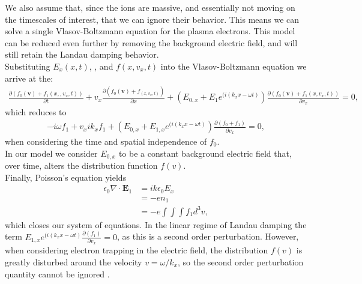\documentclass{article}
\begin{document}
We also assume that, since the ions are massive, and essentially not moving on the timescales of interest, that we can ignore their behavior. This means we can solve a single Vlasov-Boltzmann equation for the plasma electrons. This model can be reduced even further by removing the background electric field, and will still retain the Landau damping behavior.\\
Substituting $E_x(x,t)$, , and $f(x,v_x,t)$ into the Vlasov-Boltzmann equation we arrive at the:
\begin{align*}
\frac{\partial(f_0(\textbf{v}) + f_1(x,,v_x,t))}{\partial t} +  v_{x}\frac{\partial( f_0(\textbf{v}) + f_(x,v_x,t))}{\partial x} + (E_{0,x} + E_1e^{(i(k_x x-\omega t)})\frac{\partial(f_0(\textbf{v}) + f_1(x,v_x,t))}{\partial v_x}=0,
\end{align*}
which reduces to
\begin{align*}
-i\omega f_1 +  v_{x}ik_xf_1 + (E_{0,x} + E_{1,x}e^{(i(k_x x-\omega t)})\frac{\partial( f_0 + f_1)}{\partial v_x} =0,
\end{align*}
when considering the time and spatial independence of $f_0$.\\
In our model we consider $E_{0,x}$ to be a constant background electric field that, over time, alters the distribution function $f(v)$.\\
Finally, Poisson's equation yields
\begin{align*}
\epsilon_{0} \nabla \cdot \textbf{E}_1 &= ik \epsilon_0E_x\\
& = -en_1\\
& = -e \int \int \int f_1 d^3 v,
\end{align*}
which closes our system of equations.
In the linear regime of Landau damping the term $E_{1,x}e^{(i(k_x x-\omega t)}\frac{\partial(  f_1)}{\partial v_x}=0$, as this is a second order perturbation. However, when considering electron trapping in the electric field, the distribution $f(v)$ is greatly disturbed around the velocity $v=\omega/k_x$, so the second order perturbation quantity cannot be ignored \cite{francis_f_chen_introduction_2016}.\\
\end{document}
